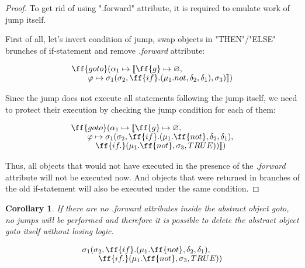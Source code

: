 \documentclass[sigplan,review,11pt,nonacm,natbib=false]{acmart}
\newcommand\br{\\[-4pt]}
\newtheorem{corollary}{Corollary}[theorem]
\begin{document}
\begin{proof}
To get rid of using ".forward" attribute, it is required to emulate work of jump itself.

First of all, let's invert condition of jump, swap objects in "THEN"/"ELSE" brunches of if-statement and remove \emph{.forward} attribute:

\begin{equation}
\begin{split}
& \ff{goto} ( \alpha_1 \mapsto \llbracket \ff{g} \mapsto \varnothing, \br
& \quad \quad \varphi \mapsto \sigma_1 ( \sigma_2,  \ff{if}.(\mu_1.not, \delta_2, \delta_1), \sigma_3) \rrbracket) \\
\end{split}
\end{equation}

Since the jump does not execute all statements following the jump itself, we need to protect their execution by checking the jump condition for each of them:

\begin{equation}
\begin{split}
& \ff{goto} ( \alpha_1 \mapsto \llbracket \ff{g} \mapsto \varnothing, \br
& \quad \quad \varphi \mapsto \sigma_1(\sigma_2,  \ff{if}.(\mu_1.\ff{not}, \delta_2, \delta_1), \br
& \quad \quad \quad \ff{if.}(\mu_1.\ff{not}, \sigma_3, TRUE)) \rrbracket) \\
\end{split}
\end{equation}

Thus, all objects that would not have executed in the presence of the \emph{.forward} attribute will not be executed now. And objects that were returned in branches of the old if-statement will also be executed under the same condition.

\end{proof}

\begin{corollary}
If there are no \emph{.forward} attributes inside the abstract object goto, no jumps will be performed and therefore it is possible to delete the abstract object goto itself without losing logic.
\end{corollary}

\begin{equation}
\begin{split}
& \sigma_1( \sigma_2, \ff{if}.(\mu_1.\ff{not}, \delta_2, \delta_1), \br
& \quad \quad \ff{if.}(\mu_1.\ff{not}, \sigma_3, TRUE)) \\
\end{split}
\end{equation}
\end{document}

